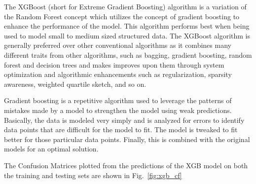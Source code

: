 \documentclass[runningheads]{llncs}
\makeatletter
\let\oldsubsubsection\subsubsection
\renewcommand\subsubsection{\@ifstar{\oldsubsubsection}{\oldsubsubsection*}}
\let\oldparagraph\paragraph
\renewcommand\paragraph{\@ifstar{\oldparagraph}{\oldparagraph*}}
\makeatother
\begin{document}
\hypertarget{xgboost}{%
\subsubsection{XGBoost}\label{xgboost}}

The XGBoost (short for Extreme Gradient Boosting) algorithm is a
variation of the Random Forest concept which utilizes the concept of
gradient boosting to enhance the performance of the model. This
algorithm performs best when being used to model small to medium sized
structured data. The XGBoost algorithm is generally preferred over other
conventional algorithms as it combines many different traits from other
algorithms, such as bagging, gradient boosting, random forest and
decision trees and makes improves upon them through system optimization
and algorithmic enhancements such as regularization, sparsity awareness,
weighted quartile sketch, and so on.

\hypertarget{gradient-boosting}{%
\paragraph{Gradient Boosting}\label{gradient-boosting}}

Gradient boosting is a repetitive algorithm used to leverage the
patterns of mistakes made by a model to strengthen the model using weak
predictions. Basically, the data is modeled very simply and is analyzed
for errors to identify data points that are difficult for the model to
fit. The model is tweaked to fit better for those particular data
points. Finally, this is combined with the original models for an
optimal solution.

The Confusion Matrices plotted from the predictions of the XGB model on
both the training and testing sets are shown in Fig.~\ref{fig:xgb_cf}
\end{document}

